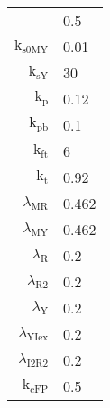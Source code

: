 \documentclass[11pt]{article}
\begin{document}
\begin{table}
\begin{tabular}{r|l}
               &
            $ 
            $0.5$ 
            $
        \\
            $ 
            \text{k}_{\text{s0MY}} 
            $
               &
            $ 
            $0.01$ 
            $
        \\
            $ 
            \text{k}_{\text{sY}} 
            $
               &
            $ 
            $30$ 
            $
        \\
            $ 
            \text{k}_{\text{p}} 
            $
               &
            $ 
            $0.12$ 
            $
        \\
            $ 
            \text{k}_{\text{pb}} 
            $
               &
            $ 
            $0.1$ 
            $
        \\
            $ 
            \text{k}_{\text{ft}} 
            $
               &
            $ 
            $6$ 
            $
        \\
            $ 
            \text{k}_{\text{t}} 
            $
               &
            $ 
            $0.92$ 
            $
        \\
            $ 
            \lambda_{\text{MR}} 
            $
               &
            $ 
            $0.462$ 
            $
        \\
            $ 
            \lambda_{\text{MY}} 
            $
               &
            $ 
            $0.462$ 
            $
        \\
            $ 
            \lambda_{\text{R}} 
            $
               &
            $ 
            $0.2$ 
            $
        \\
            $ 
            \lambda_{\text{R2}} 
            $
               &
            $ 
            $0.2$ 
            $
        \\
            $ 
            \lambda_{\text{Y}} 
            $
               &
            $ 
            $0.2$ 
            $
        \\
            $ 
            \lambda_{\text{YIex}} 
            $
               &
            $ 
            $0.2$ 
            $
        \\
            $ 
            \lambda_{\text{I2R2}} 
            $
               &
            $ 
            $0.2$ 
            $
        \\
            $ 
            \text{k}_{\text{cFP}} 
            $
               &
            $ 
            $0.5$ 
            $
        \\

\end{tabular}
\end{table}
\end{document}
